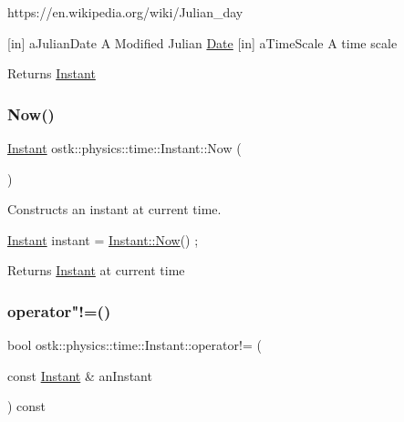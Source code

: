 https\+://en.wikipedia.\+org/wiki/\+Julian\+\_\+day

\mbox{[}in\mbox{]} a\+Julian\+Date A Modified Julian \hyperlink{classostk_1_1physics_1_1time_1_1_date}{Date}  \mbox{[}in\mbox{]} a\+Time\+Scale A time scale \begin{DoxyReturn}{Returns}
\hyperlink{classostk_1_1physics_1_1time_1_1_instant}{Instant} 
\end{DoxyReturn}
\mbox{\label{classostk_1_1physics_1_1time_1_1_instant_afbc9a9219aa94e8a828f5876ee68f42c}} 
\subsubsection{\texorpdfstring{Now()}{Now()}}
{\footnotesize\ttfamily \hyperlink{classostk_1_1physics_1_1time_1_1_instant}{Instant} ostk\+::physics\+::time\+::\+Instant\+::\+Now (\begin{DoxyParamCaption}{ }\end{DoxyParamCaption})\hspace{0.3cm}{\ttfamily [static]}}



Constructs an instant at current time. 


\begin{DoxyCode}
\hyperlink{classostk_1_1physics_1_1time_1_1_instant_a132c1e4b2fe9a9a671109206e297bd5d}{Instant} instant = \hyperlink{classostk_1_1physics_1_1time_1_1_instant_afbc9a9219aa94e8a828f5876ee68f42c}{Instant::Now}() ;
\end{DoxyCode}


\begin{DoxyReturn}{Returns}
\hyperlink{classostk_1_1physics_1_1time_1_1_instant}{Instant} at current time 
\end{DoxyReturn}
\mbox{\label{classostk_1_1physics_1_1time_1_1_instant_a897d758d25118001f6958c865cb6f0e2}} 
\subsubsection{\texorpdfstring{operator"!=()}{operator!=()}}
{\footnotesize\ttfamily bool ostk\+::physics\+::time\+::\+Instant\+::operator!= (\begin{DoxyParamCaption}\item[{const \hyperlink{classostk_1_1physics_1_1time_1_1_instant}{Instant} \&}]{an\+Instant }\end{DoxyParamCaption}) const}



